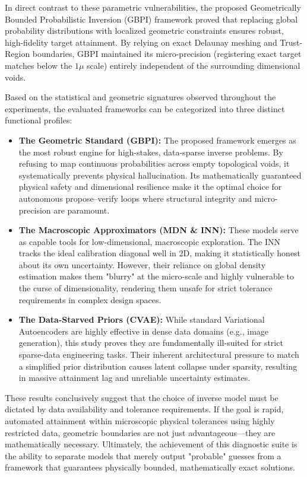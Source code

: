 In direct contrast to these parametric vulnerabilities, the proposed Geometrically Bounded Probabilistic Inversion (GBPI) framework proved that replacing global probability distributions with localized geometric constraints ensures robust, high-fidelity target attainment. By relying on exact Delaunay meshing and Trust-Region boundaries, GBPI maintained its micro-precision (registering exact target matches below the $1\mu$ scale) entirely independent of the surrounding dimensional voids. 

Based on the statistical and geometric signatures observed throughout the experiments, the evaluated frameworks can be categorized into three distinct functional profiles:

\begin{itemize}
    \item \textbf{The Geometric Standard (GBPI):} The proposed framework emerges as the most robust engine for high-stakes, data-sparse inverse problems. By refusing to map continuous probabilities across empty topological voids, it systematically prevents physical hallucination. Its mathematically guaranteed physical safety and dimensional resilience make it the optimal choice for autonomous propose--verify loops where structural integrity and micro-precision are paramount.
    \item \textbf{The Macroscopic Approximators (MDN \& INN):} These models serve as capable tools for low-dimensional, macroscopic exploration. The INN tracks the ideal calibration diagonal well in 2D, making it statistically honest about its own uncertainty. However, their reliance on global density estimation makes them "blurry" at the micro-scale and highly vulnerable to the curse of dimensionality, rendering them unsafe for strict tolerance requirements in complex design spaces.
    \item \textbf{The Data-Starved Priors (CVAE):} While standard Variational Autoencoders are highly effective in dense data domains (e.g., image generation), this study proves they are fundamentally ill-suited for strict sparse-data engineering tasks. Their inherent architectural pressure to match a simplified prior distribution causes latent collapse under sparsity, resulting in massive attainment lag and unreliable uncertainty estimates.
\end{itemize}

These results conclusively suggest that the choice of inverse model must be dictated by data availability and tolerance requirements. If the goal is rapid, automated attainment within microscopic physical tolerances using highly restricted data, geometric boundaries are not just advantageous—they are mathematically necessary. Ultimately, the achievement of this diagnostic suite is the ability to separate models that merely output "probable" guesses from a framework that guarantees physically bounded, mathematically exact solutions.

